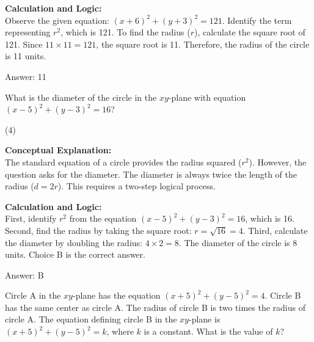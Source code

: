 \documentclass[11pt,paper=a4,answers]{exam}
\begin{document}
\begin{questions}
\begin{solution}
\vspace{30pt}

\textbf{Calculation and Logic:} \\
Observe the given equation: $(x + 6)^2 + (y + 3)^2 = 121$. Identify the term representing $r^2$, which is 121. To find the radius ($r$), calculate the square root of 121. Since $11 \times 11 = 121$, the square root is 11. Therefore, the radius of the circle is 11 units.

\vspace{30pt}

Answer: \colorbox{yellow!100}{11}
\end{solution}

\vspace{60pt}

\question
What is the diameter of the circle in the $xy$-plane with equation $(x - 5)^2 + (y - 3)^2 = 16$?
\begin{tasks}(4)
\end{tasks}

\begin{solution}
\textbf{Conceptual Explanation:} \\
The standard equation of a circle provides the radius squared ($r^2$). However, the question asks for the diameter. The diameter is always twice the length of the radius ($d = 2r$). This requires a two-step logical process.

\vspace{30pt}

\textbf{Calculation and Logic:} \\
First, identify $r^2$ from the equation $(x - 5)^2 + (y - 3)^2 = 16$, which is 16. Second, find the radius by taking the square root: $r = \sqrt{16} = 4$. Third, calculate the diameter by doubling the radius: $4 \times 2 = 8$. The diameter of the circle is 8 units. Choice B is the correct answer.

\vspace{30pt}

Answer: \colorbox{yellow!100}{B}
\end{solution}

\vspace{60pt}

\question
Circle A in the $xy$-plane has the equation $(x + 5)^2 + (y - 5)^2 = 4$. Circle B has the same center as circle A. The radius of circle B is two times the radius of circle A. The equation defining circle B in the $xy$-plane is $(x + 5)^2 + (y - 5)^2 = k$, where $k$ is a constant. What is the value of $k$?


\end{questions}
\end{document}
